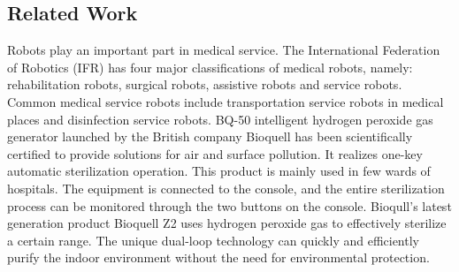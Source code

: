 \subsection{Related Work}
Robots play an important part in medical service. The International Federation of Robotics (IFR) has four major classifications of medical robots, namely: rehabilitation robots, surgical robots, assistive robots and service robots. Common medical service robots include transportation service robots in medical places and disinfection service robots.
BQ-50 intelligent hydrogen peroxide gas generator launched by the British company Bioquell has been scientifically certified to provide solutions for air and surface pollution. It realizes one-key automatic sterilization operation\cite{rowan2020unlocking}. This product is mainly used in few wards of hospitals. The equipment is connected to the console, and the entire sterilization process can be monitored through the two buttons on the console. 
Bioqull’s latest generation product Bioquell Z2 uses hydrogen peroxide gas to effectively sterilize a certain range. The unique dual-loop technology can quickly and efficiently purify the indoor environment without the need for environmental protection. 


